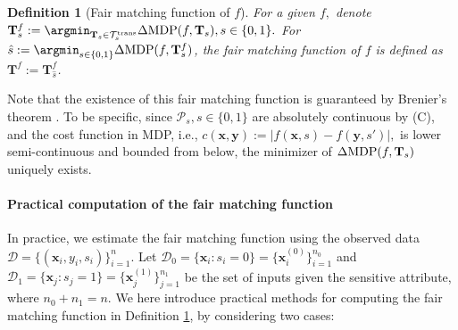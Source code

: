 \documentclass[10pt]{article} %
\newtheorem{definition}[theorem]{Definition}
\begin{document}
\begin{definition}[{Fair matching function} of $f$]\label{def:corr_match_f}
    For a given $f,$ denote
    $
    \mathbf{T}_{s}^{f} := \argmin_{ \mathbf{T}_{s} \in \mathcal{T}_{s}^{\textup{trans}} } \Delta \textup{MDP} (f, \mathbf{T}_{s}),
    s \in \{0, 1\}.
    $
    For
    $\hat{s} := \argmin_{s \in \{ 0,1 \}} \Delta \textup{MDP} (f, \mathbf{T}^f_{s})$,
    the {fair matching function} of $f$ is defined as $\mathbf{T}^{f} := \mathbf{T}_{\hat{s}}^{f}$.
\end{definition}

Note that the existence of this {fair matching function} is guaranteed by Brenier's theorem \citep{villani2008optimal, 10.1214/20-AOS1997}.
To be specific, since $\mathcal{P}_{s}, s \in \{0, 1\}$ are absolutely continuous by (C), and the cost function in MDP, i.e., $c(\mathbf{x}, \mathbf{y}) := \vert f(\mathbf{x}, s) - f(\mathbf{y}, s') \vert,$ is lower semi-continuous and bounded from below,
the minimizer of $\Delta \textup{MDP} (f, \mathbf{T}_{s})$ uniquely exists.

\paragraph{Practical computation of the {fair matching function}}
In practice, we estimate the fair matching function using the observed data $\mathcal{D} = \{(\mathbf{x}_i, y_i, s_i)\}_{i=1}^n.$
Let $\mathcal{D}_{0} = \{ \mathbf{x}_{i} : s_{i} = 0 \} = \{ \mathbf{x}_{i}^{(0)} \}_{i=1}^{n_{0}}$ and $\mathcal{D}_{1} = \{ \mathbf{x}_{j} : s_{j} = 1 \} = \{ \mathbf{x}_{j}^{(1)}\}_{j=1}^{n_{1}}$ be the set of inputs given the sensitive attribute, where $n_{0} + n_{1} = n.$
We here introduce practical methods for computing the fair matching function in Definition \ref{def:corr_match_f}, by considering two cases:
\end{document}
